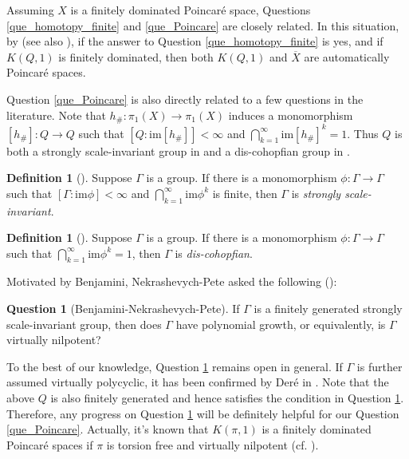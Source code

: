 \documentclass[12pt]{amsart}
\theoremstyle{plain}
\theoremstyle{definition}
\newtheorem{definition}[theorem]{Definition}
\theoremstyle{question}
\newtheorem{question}[theorem]{Question}
\theoremstyle{remark}
\theoremstyle{assumption}
\numberwithin{equation}{section}
\theoremstyle{bigthm}
\begin{document}
Assuming $X$ is a finitely dominated Poincar\'{e} space, Questions \ref{que_homotopy_finite} and \ref{que_Poincare} are closely related. In this situation, by \cite{Gottlieb} (see also \cite[Theorem~G]{Klein_Qin_Su}), if the answer to Question \ref{que_homotopy_finite} is yes, and if $K(Q,1)$ is finitely dominated, then both $K(Q,1)$ and $\overline{X}$ are automatically Poincar\'{e} spaces.

Question \ref{que_Poincare} is also directly related to a few questions in the literature. Note that $h_{\#} \colon  \pi_{1} (X) \rightarrow \pi_{1} (X)$ induces a monomorphism $[h_{\#}] \colon  Q \rightarrow Q$ such that $[Q: \mathrm{im} [h_{\#}]] < \infty$ and $\bigcap_{k=1}^{\infty} \mathrm{im} [h_{\#}]^{k} =1$. Thus $Q$ is both a strongly scale-invariant group in \cite{Nekrashevych_Pete} and a dis-cohopfian group in \cite{Cornulier}.

\begin{definition}[\cite{Nekrashevych_Pete}]
Suppose $\Gamma$ is a group. If there is a monomorphism $\phi \colon  \Gamma \rightarrow \Gamma$ such that $[\Gamma: \mathrm{im} \phi] < \infty$ and $\bigcap_{k=1}^{\infty} \mathrm{im} \phi^{k}$ is finite, then $\Gamma$ is \textit{strongly scale-invariant}.
\end{definition}

\begin{definition}[\cite{Cornulier}]
Suppose $\Gamma$ is a group. If there is a monomorphism $\phi \colon  \Gamma \rightarrow \Gamma$ such that $\bigcap_{k=1}^{\infty} \mathrm{im} \phi^{k} = 1$, then $\Gamma$ is \textit{dis-cohopfian}.
\end{definition}

Motivated by Benjamini, Nekrashevych-Pete asked the following (\cite[Question~1.1]{Nekrashevych_Pete}):
\begin{question}[Benjamini-Nekrashevych-Pete]\label{que_scale_invariant}
If $\Gamma$ is a finitely generated strongly scale-invariant group, then does $\Gamma$ have polynomial growth, or equivalently, is $\Gamma$ virtually nilpotent?
\end{question}

To the best of our knowledge, Question \ref{que_scale_invariant} remains open in general. If $\Gamma$ is further assumed virtually polycyclic, it has been confirmed by Der\'{e} in \cite[Theorem~3.10]{Dere22}. Note that the above $Q$ is also finitely generated and hence satisfies the condition in Question \ref{que_scale_invariant}. Therefore, any progress on Question \ref{que_scale_invariant} will be definitely helpful for our Question \ref{que_Poincare}. Actually, it's known that $K(\pi, 1)$ is a finitely dominated Poincar\'{e} spaces if $\pi$ is torsion free and virtually nilpotent (cf. \cite[p.~596]{Johnson_Wall}).
\end{document}

